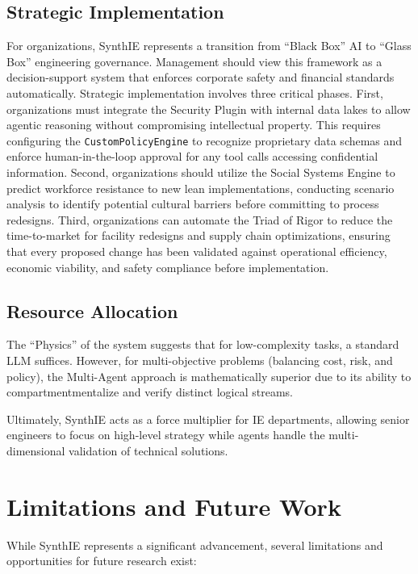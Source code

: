 \documentclass[12pt,a4paper]{article}
\begin{document}
\subsection{Strategic Implementation}

For organizations, SynthIE represents a transition from ``Black Box'' AI to ``Glass Box'' engineering governance. Management should view this framework as a decision-support system that enforces corporate safety and financial standards automatically. Strategic implementation involves three critical phases. First, organizations must integrate the Security Plugin with internal data lakes to allow agentic reasoning without compromising intellectual property. This requires configuring the \texttt{CustomPolicyEngine} to recognize proprietary data schemas and enforce human-in-the-loop approval for any tool calls accessing confidential information. Second, organizations should utilize the Social Systems Engine to predict workforce resistance to new lean implementations, conducting scenario analysis to identify potential cultural barriers before committing to process redesigns. Third, organizations can automate the Triad of Rigor to reduce the time-to-market for facility redesigns and supply chain optimizations, ensuring that every proposed change has been validated against operational efficiency, economic viability, and safety compliance before implementation.

\subsection{Resource Allocation}

The ``Physics'' of the system suggests that for low-complexity tasks, a standard LLM suffices. However, for multi-objective problems (balancing cost, risk, and policy), the Multi-Agent approach is mathematically superior due to its ability to compartmentmentalize and verify distinct logical streams.

Ultimately, SynthIE acts as a force multiplier for IE departments, allowing senior engineers to focus on high-level strategy while agents handle the multi-dimensional validation of technical solutions.

\section{Limitations and Future Work}

While SynthIE represents a significant advancement, several limitations and opportunities for future research exist:
\end{document}
